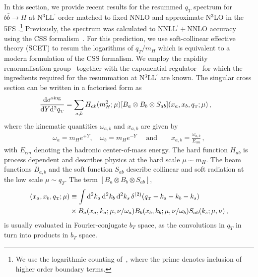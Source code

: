 \documentclass[11pt,a4paper]{article}
\newcommand{\dd}{\mathop{}\!\mathrm{d}}
\begin{document}
In this section, we provide recent results for the resummed $q_T$ spectrum for $b\bar{b}\to H$ at N$^3$LL$^{\prime}$ order matched to fixed NNLO and approximate N$^3$LO in the 5FS \cite{Cal:2023mib}.\footnote{We use the logarithmic counting of~, where the prime denotes inclusion of higher order boundary terms.} Previously, the spectrum was calculated to NNLL$^{\prime}+$NNLO accuracy~\cite{Harlander:2014hya} using the CSS formalism~\cite{Collins:1981uk,Collins:1981va, Collins:1984kg}. For this prediction, we use soft-collinear effective theory (SCET)
\cite{Bauer:2000yr,Bauer:2001ct,Bauer:2001yt,Bauer:2002nz,Beneke:2002ph} to resum the logarithms of $q_T/m_H$ which is equivalent to a modern formulation of the CSS formalism.
We employ the rapidity
renormalisation group~\cite{Chiu:2012ir} together with the
exponential regulator~\cite{Li:2016axz} for which the ingredients
required for the resummation at N$^3$LL$^{\prime}$ are known.
The singular cross section can be written in a factorised form as
\begin{align} \label{tmd_factorization}
\frac{\mathrm{d} \sigma^\mathrm{sing}}{\mathrm{d} Y \mathrm{d}^2 \qt}
&= \sum_{a,b} H_{ab}(m_H^2; \mu) [B_a\otimes  B_b \otimes S_{ab}]( x_a, x_b, \qt; \mu)
\,,\end{align}
where the kinematic quantities $\omega_{a,b}$ and $x_{a,b}$ are given by
\begin{align}
\omega_{a}=m_H e^{+ Y}, \quad \omega_{b}=m_H e^{-Y} \quad \text{ and} \quad \quad x_{a,b}= \frac{\omega_{a,b}}{E_{cm}}
\,,\end{align}
with $E_{cm}$ denoting the hadronic center-of-mass energy.
The hard function $H_{ab}$ is process dependent and describes physics at the hard scale $\mu\sim m_H$. The beam functions $B_{a,b}$ and the soft function $S_{ab}$ describe collinear and soft radiation at the low scale $\mu \sim q_T$. 
The term $[B_a\otimes  B_b \otimes S_{ab}]$,
\begin{align}
	[B_a\otimes  B_b \otimes S_{ab}]( x_a, x_b, \qt; \mu) &\equiv \int \dd^2 k_a \dd^2 k_b \dd^2 k_s \,\delta^{(2)}(\qt-k_a-k_b-k_s) \nonumber\\
	&\times B_a(x_a,k_a;\mu,\nu/\omega_a) B_b(x_b,k_b;\mu,\nu/\omega_b) S_{ab}(k_s;\mu,\nu)\,,
\end{align}
is usually evaluated in Fourier-conjugate $b_T$ space, as the convolutions in $q_T$ in
 turn into products in $b_T$ space.
\end{document}
